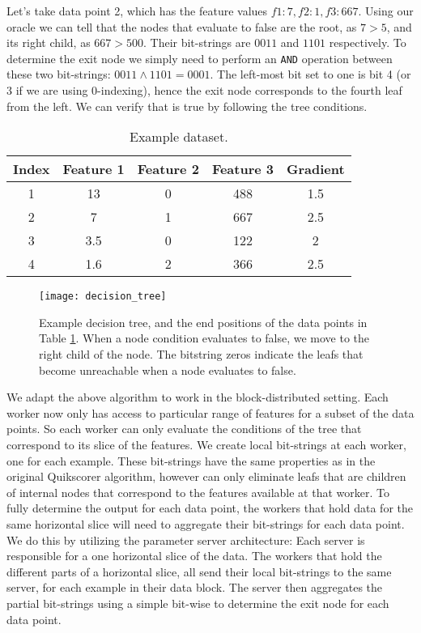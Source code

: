 Let's take data point 2, which has the feature values $f1: 7, f2:1 , f3: 667$.
Using our oracle we can tell that the nodes that evaluate to false are the root, as $7 > 5$,
and its right child, as $667 > 500$. Their bit-strings are $0011$ and $1101$ respectively. To determine
the exit node we simply need to perform an \texttt{AND} operation between these two
bit-strings: $0011 \land 1101 = 0001$. The left-most bit set to one
is bit 4 (or 3 if we are using 0-indexing), hence the exit node corresponds
to the fourth leaf from the left. We can verify that is true by following the tree
conditions.

\begin{table}
	\centering
	\begin{tabular}{cccc|c}
		\toprule
		Index & Feature 1 & Feature 2 & Feature 3 & Gradient \\
		\midrule
		\rowcolor{CBOne}
		1 & 13 & 0 & 488 & 1.5 \\
		\rowcolor{CBTwo}
		2 & 7 & 1 & 667 & 2.5 \\
		\rowcolor{CBThree}
		3 & 3.5 & 0 & 122 & 2 \\
		\rowcolor{CBFour}
		4 & 1.6 & 2 & 366 & 2.5 \\
		\bottomrule
	\end{tabular}
	\caption{Example dataset.}
	\label{tab:example-data-reprod}
\end{table}

\begin{figure*}
	\centering
	\texttt{[image: decision\_tree]}
	\caption{Example decision tree, and the end positions of the data points in Table
	\ref{tab:example-data-reprod}. When a node condition evaluates to false, we move to
	the right child of the node.
	The bitstring  zeros indicate the leafs that become unreachable when a node evaluates to false.}
	\label{fig:quickscorer-example}
\end{figure*}


We adapt the above algorithm to work in the block-distributed setting. Each worker
now only has access to particular range of features for a subset of the data points.
So each worker can only evaluate the conditions of the tree that correspond to its slice
of the features. We create local bit-strings at each worker, one for each example.
These bit-strings have the same properties as in the original Quikscorer algorithm,
however can only eliminate leafs that are children of internal nodes that correspond
to the features available at that worker. To fully determine the output for each
data point, the workers that hold data for the same horizontal slice will need
to aggregate their bit-strings for each data point. We do this by utilizing the
parameter server \cite{muPS} architecture: Each server is responsible for a
one horizontal slice of the data. The workers that hold the different parts of
a horizontal slice, all send their local bit-strings to the same server, for each example in
their data block.
The server then aggregates the partial bit-strings using a simple bit-wise \AND to determine the exit
node for each data point.

